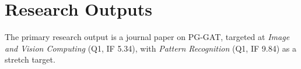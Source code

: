 \section{Research Outputs}
\label{sec_intro_outputs}

The primary research output is a journal paper on PG-GAT,
targeted at \emph{Image and Vision Computing} (Q1, IF 5.34),
with \emph{Pattern Recognition} (Q1, IF 9.84) as a stretch target.
